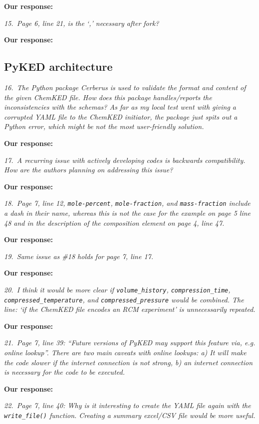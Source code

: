 \documentclass[a4paper,10pt]{elsarticle}
\begin{document}
\textbf{Our response:}


\textit{15.~Page 6, line 21, is the `,' necessary after fork?}

\textbf{Our response:}


\subsection*{PyKED architecture}

\textit{16.~The Python package Cerberus is used to validate the format and content of the given ChemKED file. How does this package handles/reports the inconsistencies with the schemas? As far as my local test went with giving a corrupted YAML file to the ChemKED initiator, the package just spits out a Python error, which might be not the most user-friendly solution.}

\textbf{Our response:}


\textit{17.~A recurring issue with actively developing codes is backwards compatibility. How are the authors planning on addressing this issue?}

\textbf{Our response:}


\textit{18.~Page 7, line 12, \texttt{mole-percent}, \texttt{mole-fraction}, and \texttt{mass-fraction} include a dash in their name, whereas this is not the case for the example on page 5 line 48 and in the description of the composition element on page 4, line 47.}

\textbf{Our response:}


\textit{19.~Same issue as \#18 holds for page 7, line 17.}

\textbf{Our response:}


\textit{20.~I think it would be more clear if \texttt{volume\_history}, \texttt{compression\_time}, \texttt{compressed\_temperature},
and \texttt{compressed\_pressure} would be combined. The line: `if the ChemKED file encodes an
RCM experiment' is unnecessarily repeated.}

\textbf{Our response:}


\textit{21.~Page 7, line 39: ``Future versions of PyKED may support this feature via, e.g. online lookup''.
There are two main caveats with online lookups: a) It will make the code slower if the internet
connection is not strong, b) an internet connection is necessary for the code to be executed.}

\textbf{Our response:}


\textit{22.~Page 7, line 40: Why is it interesting to create the YAML file again with the \texttt{write\_file()} function.
Creating a summary excel/CSV file would be more useful.}
\end{document}
